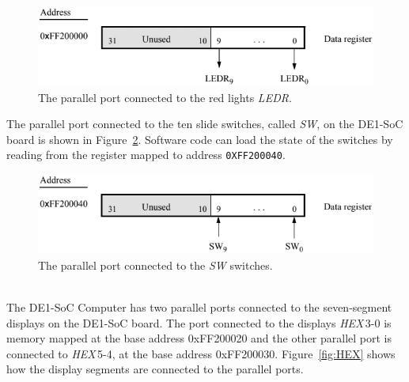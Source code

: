 \documentclass[epsfig,10pt,fullpage]{article}
\begin{document}
\begin{figure}[htb]
	\begin{center}
	\includegraphics[scale=.55]{figures/figureLEDR.png}
	\end{center}
	\caption{The parallel port connected to the red lights {\it LEDR}.}
\label{fig:LED}
\end{figure}

\noindent
The parallel port connected to the ten slide switches, called {\it SW}, on the DE1-SoC
board is shown in Figure~\ref{fig:SW}. Software code can load the state of the switches by
reading from the register mapped to address \texttt{0XFF200040}.

\begin{figure}[htb]
	\begin{center}
	\includegraphics[scale=.55]{figures/figureSW.png}
	\end{center}
	\caption{The parallel port connected to the {\it SW} switches.}
\label{fig:SW}
\end{figure}

~\\
The DE1-SoC Computer has two parallel ports connected to the seven-segment 
displays on the DE1-SoC board. The port connected to the displays {\it HEX}$\,$3-0 is memory 
mapped at the base address {\sf 0xFF200020} and the other parallel port is connected to 
{\it HEX}$\,$5-4, at the base address {\sf 0xFF200030}. 
Figure~\ref{fig:HEX} shows how the display segments are connected to the parallel ports.  
\end{document}
